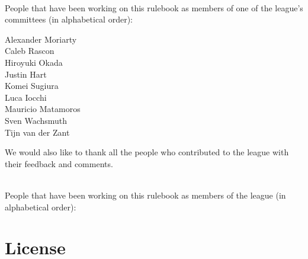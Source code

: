 ~\\\noindent People that have been working on this rulebook as members of one of the league's committees (in alphabetical order):
\begin{center}
\begin{minipage}{0.8\textwidth}
\begin{multicols}{3}%
\footnotesize
\noindent%

Alexander Moriarty\\
Caleb Rascon\\
Hiroyuki Okada\\
\columnbreak
Justin Hart\\
Komei Sugiura\\
Luca Iocchi\\
\columnbreak
Mauricio Matamoros\\
Sven Wachsmuth\\
Tijn van der Zant\\
\end{multicols}
\end{minipage}
\end{center}

We would also like to thank all the people who contributed to the \AtHome{} league with their feedback and comments.

~\\\noindent People that have been working on this rulebook as members of the league (in alphabetical order):
\begin{center}
\begin{minipage}{0.8\textwidth}
\end{minipage}
\end{center}

\section*{License}

\doclicenseThis


